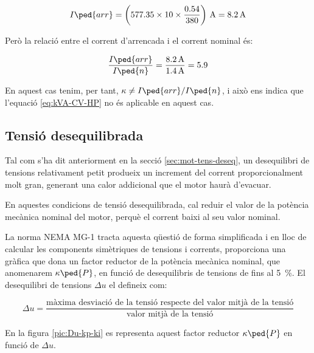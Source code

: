 \begin{exemple}[\MotorArrencNEMA{}]
    \[
      I\ped{arr} = \left(\num{577,35} \times 10 \times \frac{\num{0,54}}{380}\right) \,\unit{A} = \qty{8,2}{A}
    \]

    Però la relació entre el corrent d'arrencada i el corrent nominal és:
    
    \[
        \frac{I\ped{arr}}{I\ped{n}} = \frac{\qty{8,2}{A}}{\qty{1,4}{A}} = \num{5,9}
    \]

    En aquest cas tenim, per tant, $\kappa \neq I\ped{arr}/I\ped{n}$, i això ens indica que l'equació \eqref{eq:kVA-CV-HP} no és aplicable en aquest cas.
\end{exemple}

\subsection{Tensió desequilibrada}\label{sec:NEMA-U-deseq}

Tal com s'ha dit anteriorment en la secció \ref{sec:mot-tens-deseq}, un desequilibri de tensions relativament petit produeix un increment del corrent proporcionalment molt gran, generant una  calor addicional que el motor haurà d'evacuar.

En aquestes condicions de tensió desequilibrada, cal reduir el valor de la potència mecànica nominal del motor, perquè el corrent baixi al seu valor nominal.

La norma NEMA MG-1 tracta aquesta qüestió de forma simplificada i en lloc de calcular les components simètriques de tensions i corrents, proporciona una gràfica que dona un factor reductor de la potència mecànica nominal, que anomenarem $\kappa\ped{P}$, en funció de desequilibris de tensions de fins al \qty{5}{\%}. El desequilibri de tensions $\Delta u$ el defineix com:

\begin{equation}
    \Delta u = \frac{\text{màxima desviació de la tensió respecte del valor mitjà de la tensió}}{\text{valor mitjà de la tensió}}
\end{equation}

En la figura \vref{pic:Du-kp-ki} es representa aquest factor reductor $\kappa\ped{P}$ en funció de $\Delta u$.

\begin{center}
    
    \label{pic:Du-kp-ki}
\end{center}



